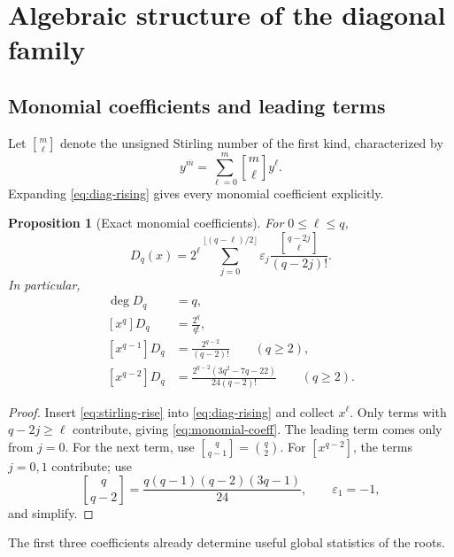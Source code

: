 \documentclass[11pt]{article}
\newtheorem{proposition}[theorem]{Proposition}
\theoremstyle{definition}
\theoremstyle{remark}
\newcommand{\eps}{\varepsilon}
\newcommand{\Diag}{D}
\newcommand{\rising}[2]{#1^{\overline{#2}}}
\newcommand{\stirlingone}[2]{\genfrac{[}{]}{0pt}{}{#1}{#2}}
\begin{document}
\section{Algebraic structure of the diagonal family}

\subsection{Monomial coefficients and leading terms}

Let \(\stirlingone{m}{\ell}\) denote the unsigned Stirling number of
the first kind, characterized by
\begin{equation}
 \rising{y}{m}=\sum_{\ell=0}^{m}
 \stirlingone{m}{\ell}y^\ell.                         \label{eq:stirling-rise}
\end{equation}
Expanding \cref{eq:diag-rising} gives every monomial coefficient explicitly.

\begin{proposition}[Exact monomial coefficients]\label{prop:monomial-coeff}
For \(0\leq\ell\leq q\),
\begin{equation}
 [x^\ell]\Diag_q(x)
 =2^\ell
 \sum_{j=0}^{\lfloor(q-\ell)/2\rfloor}
 \eps_j\frac{\stirlingone{q-2j}{\ell}}{(q-2j)!}.      \label{eq:monomial-coeff}
\end{equation}
In particular,
\begin{align}
 \deg\Diag_q&=q,                                           \label{eq:degree}\\
 [x^q]\Diag_q&=\frac{2^q}{q!},                             \label{eq:lead}\\
 [x^{q-1}]\Diag_q&=\frac{2^{q-2}}{(q-2)!}\qquad(q\geq2),  \label{eq:sublead}\\
 [x^{q-2}]\Diag_q&=
 \frac{2^{q-2}(3q^2-7q-22)}{24(q-2)!}\qquad(q\geq2).      \label{eq:third-coeff}
\end{align}
\end{proposition}

\begin{proof}
Insert \cref{eq:stirling-rise} into \cref{eq:diag-rising} and collect
\(x^\ell\).  Only terms with \(q-2j\geq\ell\) contribute, giving
\cref{eq:monomial-coeff}.  The leading term comes only from \(j=0\).
For the next term, use
\(\stirlingone{q}{q-1}=\binom q2\).  For
\([x^{q-2}]\), the terms \(j=0,1\) contribute; use
\[
 \stirlingone{q}{q-2}
 =\frac{q(q-1)(q-2)(3q-1)}{24},
 \qquad \eps_1=-1,
\]
and simplify.
\end{proof}

The first three coefficients already determine useful global statistics of
the roots.
\end{document}
